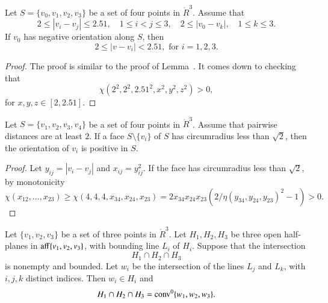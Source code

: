 \newpage
\begin{lemma}
 Let $S=\{v_0,v_1,v_2,v_3\}$ be a
set of four points in $\ring{R}^3$.  Assume that 
  $$
  2\le |v_i-v_j|\le 2.51,\quad 1\le i < j \le 3,
  \quad 2\le |v_0-v_k|,\quad 1\le k\le 3.
  $$
 If $v_0$
has negative orientation along
$S$, then
  $$
  2 \le |v-v_i | < 2.51, \text{ for } i=1,2,3.
  $$
\end{lemma}

\begin{proof} The proof is similar to the proof of
Lemma~. It comes down to checking that
    $$
    \chi(2^2,2^2,2.51^2,x^2,y^2,z^2)>0,$$
    for $x,y,z\in[2,2.51]$.
\end{proof}

\newpage
\begin{lemma}
%
Let $S=\{v_1,v_2,v_3,v_4\}$ be a set of four
points in $\ring{R}^3$.  Assume that pairwise
distances are at least $2$.
If a face $S\setminus\{v_i\}$ of $S$ 
has circumradius less than $\sqrt2$, then
the orientation of $v_i$ is positive in $S$.
\end{lemma}

\begin{proof}
Let $y_{ij}=|v_i-v_j|$ and $x_{ij} = y_{ij}^2$.
If the face has circumradius less than $\sqrt2$, by monotonicity
    $$\chi(x_{12},\ldots,x_{23}) \ge \chi(4,4,4,x_{34},x_{24},x_{23})
    = 2 x_{34}x_{24}x_{23}
    (2/\eta(y_{34},y_{24},y_{23})^2 - 1) >0.$$
\end{proof}

\newpage

\begin{lemma}
Let $\{v_1,v_2,v_3\}$ be a set of three points
in $\ring{R}^3$.  Let $H_1,H_2,H_3$ be three open half-planes in
${\operatorname{aff}}\{v_1,v_2,v_3\}$, with bounding line $L_i$ of $H_i$.  
Suppose that the intersection
   $$H_1\cap H_2\cap H_3$$
is nonempty and bounded.  Let $w_i$ be the intersection of the
lines $L_j$ and $L_k$, with $i,j,k$ distinct indices.  Then
$w_i\in H_i$ and
   $$H_1\cap H_2\cap H_3 = {\operatorname{conv}}^0\{w_1,w_2,w_3\}.$$
\end{lemma}

